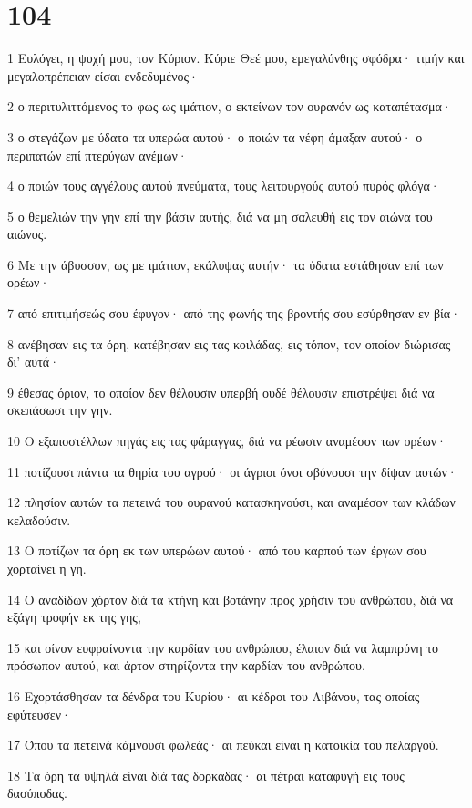 \chapter{104}

\par 1 Ευλόγει, η ψυχή μου, τον Κύριον. Κύριε Θεέ μου, εμεγαλύνθης σφόδρα· τιμήν και μεγαλοπρέπειαν είσαι ενδεδυμένος·
\par 2 ο περιτυλιττόμενος το φως ως ιμάτιον, ο εκτείνων τον ουρανόν ως καταπέτασμα·
\par 3 ο στεγάζων με ύδατα τα υπερώα αυτού· ο ποιών τα νέφη άμαξαν αυτού· ο περιπατών επί πτερύγων ανέμων·
\par 4 ο ποιών τους αγγέλους αυτού πνεύματα, τους λειτουργούς αυτού πυρός φλόγα·
\par 5 ο θεμελιών την γην επί την βάσιν αυτής, διά να μη σαλευθή εις τον αιώνα του αιώνος.
\par 6 Με την άβυσσον, ως με ιμάτιον, εκάλυψας αυτήν· τα ύδατα εστάθησαν επί των ορέων·
\par 7 από επιτιμήσεώς σου έφυγον· από της φωνής της βροντής σου εσύρθησαν εν βία·
\par 8 ανέβησαν εις τα όρη, κατέβησαν εις τας κοιλάδας, εις τόπον, τον οποίον διώρισας δι' αυτά·
\par 9 έθεσας όριον, το οποίον δεν θέλουσιν υπερβή ουδέ θέλουσιν επιστρέψει διά να σκεπάσωσι την γην.
\par 10 Ο εξαποστέλλων πηγάς εις τας φάραγγας, διά να ρέωσιν αναμέσον των ορέων·
\par 11 ποτίζουσι πάντα τα θηρία του αγρού· οι άγριοι όνοι σβύνουσι την δίψαν αυτών·
\par 12 πλησίον αυτών τα πετεινά του ουρανού κατασκηνούσι, και αναμέσον των κλάδων κελαδούσιν.
\par 13 Ο ποτίζων τα όρη εκ των υπερώων αυτού· από του καρπού των έργων σου χορταίνει η γη.
\par 14 Ο αναδίδων χόρτον διά τα κτήνη και βοτάνην προς χρήσιν του ανθρώπου, διά να εξάγη τροφήν εκ της γης,
\par 15 και οίνον ευφραίνοντα την καρδίαν του ανθρώπου, έλαιον διά να λαμπρύνη το πρόσωπον αυτού, και άρτον στηρίζοντα την καρδίαν του ανθρώπου.
\par 16 Εχορτάσθησαν τα δένδρα του Κυρίου· αι κέδροι του Λιβάνου, τας οποίας εφύτευσεν·
\par 17 Όπου τα πετεινά κάμνουσι φωλεάς· αι πεύκαι είναι η κατοικία του πελαργού.
\par 18 Τα όρη τα υψηλά είναι διά τας δορκάδας· αι πέτραι καταφυγή εις τους δασύποδας.

